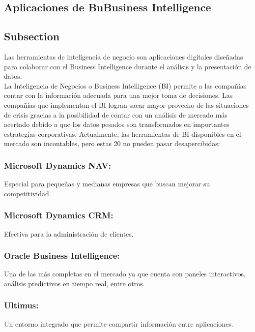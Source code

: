 \subsection{Aplicaciones de BuBusiness Intelligence } \label{sec:nada}
\subsection{Subsection}\label{sec:nada}

Las herramientas de inteligencia de negocio son aplicaciones digitales diseñadas para colaborar con el Business Intelligence durante el análisis y la presentación de datos.\\
La Inteligencia de Negocios o Business Intelligence (BI) permite a las compañías contar con la información adecuada para una mejor toma de decisiones.  Las compañías que implementan el BI logran sacar mayor provecho de las situaciones de crisis gracias a la posibilidad de contar con un análisis de mercado más acertado debido a que los datos pesados son transformados en importantes estrategias corporativas.
Actualmente, las herramientas de BI disponibles en el mercado son incontables, pero estas 20 no pueden pasar desapercibidas:

\subsubsection{Microsoft Dynamics NAV: }\label{sec:nada2} 
Especial para pequeñas y medianas empresas que buscan mejorar su competitividad.

\subsubsection{Microsoft Dynamics CRM: }\label{sec:nada2}  
Efectiva para la administración de clientes.

\subsubsection{Oracle Business Intelligence: }\label{sec:nada2} 
Una de las más completas en el mercado ya que cuenta con paneles interactivos, análisis predictivos en tiempo real, entre otros.

\subsubsection{Ultimus: }\label{sec:nada2}  
Un entorno integrado que permite compartir información entre aplicaciones.

